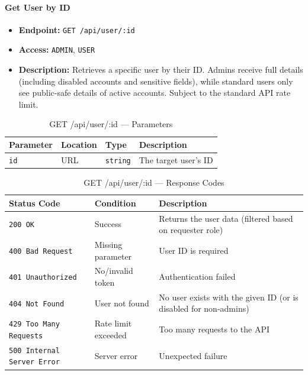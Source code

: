 \paragraph{Get User by ID}
\label{subsubsec:get-user-by-id}

\begin{itemize}
  \item \textbf{Endpoint:} \texttt{GET /api/user/:id}
  \item \textbf{Access:} \texttt{ADMIN}, \texttt{USER}
  \item \textbf{Description:} Retrieves a specific user by their ID. Admins receive full details (including disabled accounts and sensitive fields), while standard users only see public-safe details of active accounts. Subject to the standard API rate limit.
\end{itemize}

\begin{table}[H]
\centering
\renewcommand{\arraystretch}{1.3}
\begin{tabularx}{\textwidth}{|l|l|l|X|}
\hline
\textbf{Parameter} & \textbf{Location} & \textbf{Type} & \textbf{Description} \\
\hline
\texttt{id} & URL & \texttt{string} & The target user's ID \\
\hline
\end{tabularx}
\caption{GET /api/user/:id — Parameters}
\label{tab:get-user-by-id-params}
\end{table}

\begin{table}[H]
\centering
\renewcommand{\arraystretch}{1.3}
\begin{tabularx}{\textwidth}{|l|l|X|}
\hline
\textbf{Status Code} & \textbf{Condition} & \textbf{Description} \\
\hline
\texttt{200 OK}           & Success              & Returns the user data (filtered based on requester role) \\
\hline
\texttt{400 Bad Request}  & Missing parameter    & User ID is required \\
\hline
\texttt{401 Unauthorized} & No/invalid token     & Authentication failed \\
\hline
\texttt{404 Not Found}    & User not found       & No user exists with the given ID (or is disabled for non-admins) \\
\hline
\texttt{429 Too Many Requests} & Rate limit exceeded & Too many requests to the API \\
\hline
\texttt{500 Internal Server Error} & Server error & Unexpected failure \\
\hline
\end{tabularx}
\caption{GET /api/user/:id — Response Codes}
\label{tab:get-user-by-id-responses}
\end{table}
\FloatBarrier

